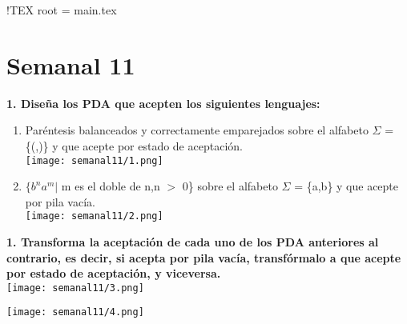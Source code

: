 !TEX root = main.tex
\renewcommand{\labelenumi}{\alph{enumi})}
\section*{Semanal 11}
\textbf{1. Diseña los PDA que acepten los siguientes lenguajes:}
\\
\begin{enumerate}
    \item Paréntesis balanceados y correctamente emparejados sobre el alfabeto $\Sigma$ = \{(,)\} y que acepte
    por estado de aceptación. \\
    \texttt{[image: semanal11/1.png]} \\
    \item $\{b^{n}a^{m} |$  m es el doble de n,n $>$ 0\} sobre el alfabeto $\Sigma$  = \{a,b\} y que acepte por pila vacía. \\
    \texttt{[image: semanal11/2.png]} \\
\end{enumerate}

\textbf{1. Transforma la aceptación de cada uno de los PDA anteriores al contrario, es decir, si acepta por
pila vacía, transfórmalo a que acepte por estado de aceptación, y viceversa.} \\


\texttt{[image: semanal11/3.png]}

\texttt{[image: semanal11/4.png]}




